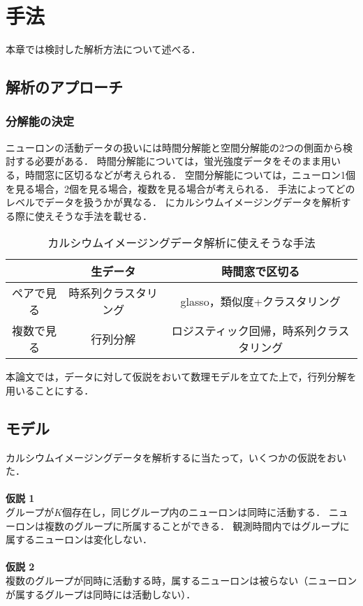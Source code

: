 \chapter{手法}
本章では検討した解析方法について述べる．
\section{解析のアプローチ}
\subsection{分解能の決定}
ニューロンの活動データの扱いには時間分解能と空間分解能の2つの側面から検討する必要がある．
時間分解能については，蛍光強度データをそのまま用いる，時間窓に区切るなどが考えられる．
空間分解能については，ニューロン1個を見る場合，2個を見る場合，複数を見る場合が考えられる．
手法によってどのレベルでデータを扱うかが異なる．
にカルシウムイメージングデータを解析する際に使えそうな手法を載せる．

\begin{table}[htb]
  \center
  \begin{tabular}{|c|cc|} \hline
    & 生データ & 時間窓で区切る \\ \hline
    ペアで見る & 時系列クラスタリング & glasso，類似度+クラスタリング\\
	  複数で見る & 行列分解 & ロジスティック回帰，時系列クラスタリング \\ \hline
  \end{tabular}
  \caption{カルシウムイメージングデータ解析に使えそうな手法}
  \label{tab:methods}
\end{table}

本論文では，データに対して仮説をおいて数理モデルを立てた上で，行列分解を用いることにする．

\section{モデル}
カルシウムイメージングデータを解析するに当たって，いくつかの仮説をおいた．
\\ \\
\noindent \textbf{仮説 1}\\
グループが$K$個存在し，同じグループ内のニューロンは同時に活動する．
ニューロンは複数のグループに所属することができる．
観測時間内ではグループに属するニューロンは変化しない．
\\ \\
\textbf{仮説 2}\\
複数のグループが同時に活動する時，属するニューロンは被らない（ニューロンが属するグループは同時には活動しない）．
\\

